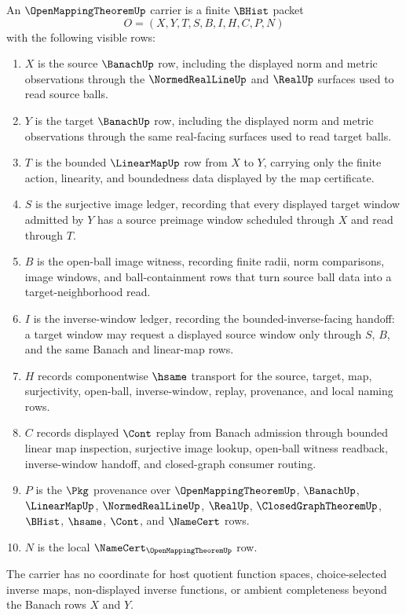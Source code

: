 \begin{definition}
\label{def:open-mapping-theorem-carrier}
An $\OpenMappingTheoremUp$ carrier is a finite $\BHist$ packet
$$
O=(X,Y,T,S,B,I,H,C,P,N)
$$
with the following visible rows:
\begin{enumerate}
\item $X$ is the source $\BanachUp$ row, including the displayed norm and metric observations through the $\NormedRealLineUp$ and $\RealUp$ surfaces used to read source balls.
\item $Y$ is the target $\BanachUp$ row, including the displayed norm and metric observations through the same real-facing surfaces used to read target balls.
\item $T$ is the bounded $\LinearMapUp$ row from $X$ to $Y$, carrying only the finite action, linearity, and boundedness data displayed by the map certificate.
\item $S$ is the surjective image ledger, recording that every displayed target window admitted by $Y$ has a source preimage window scheduled through $X$ and read through $T$.
\item $B$ is the open-ball image witness, recording finite radii, norm comparisons, image windows, and ball-containment rows that turn source ball data into a target-neighborhood read.
\item $I$ is the inverse-window ledger, recording the bounded-inverse-facing handoff: a target window may request a displayed source window only through $S$, $B$, and the same Banach and linear-map rows.
\item $H$ records componentwise $\hsame$ transport for the source, target, map, surjectivity, open-ball, inverse-window, replay, provenance, and local naming rows.
\item $C$ records displayed $\Cont$ replay from Banach admission through bounded linear map inspection, surjective image lookup, open-ball witness readback, inverse-window handoff, and closed-graph consumer routing.
\item $P$ is the $\Pkg$ provenance over $\OpenMappingTheoremUp$, $\BanachUp$, $\LinearMapUp$, $\NormedRealLineUp$, $\RealUp$, $\ClosedGraphTheoremUp$, $\BHist$, $\hsame$, $\Cont$, and $\NameCert$ rows.
\item $N$ is the local $\NameCert_{\OpenMappingTheoremUp}$ row.
\end{enumerate}
The carrier has no coordinate for host quotient function spaces, choice-selected inverse maps, non-displayed inverse functions, or ambient completeness beyond the Banach rows $X$ and $Y$.
\end{definition}

